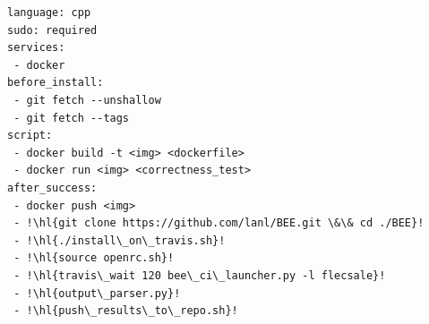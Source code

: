 \lstset{numbers=left,
xleftmargin=1.5em,
frame=single,
framexleftmargin=2em}


\lstset{language=Java}
\begin{lstlisting}[escapechar=!,
				   caption= Example Travis CI script (\texttt{.travis.yml}) for Flecsale with \texttt{BeeSwarn} scalability test. Highlighted part shows that only simple modifications are required to enable autonomic scalability test.]
language: cpp
sudo: required
services:
 - docker
before_install:
 - git fetch --unshallow 
 - git fetch --tags
script:
 - docker build -t <img> <dockerfile> 
 - docker run <img> <correctness_test>
after_success:
 - docker push <img>
 - !\hl{git clone https://github.com/lanl/BEE.git \&\& cd ./BEE}!
 - !\hl{./install\_on\_travis.sh}!
 - !\hl{source openrc.sh}!
 - !\hl{travis\_wait 120 bee\_ci\_launcher.py -l flecsale}!
 - !\hl{output\_parser.py}!
 - !\hl{push\_results\_to\_repo.sh}!
\end{lstlisting}

